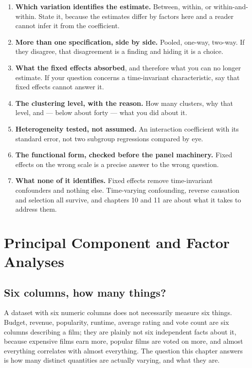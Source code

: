 \documentclass[
  letterpaper,
  10pt,
  twoside,
  openright,
  numbers=noenddot,
  chapterprefix=true]{scrbook}
\providecommand{\tightlist}{%
  \setlength{\itemsep}{0pt}\setlength{\parskip}{0pt}}
\begin{document}
\begin{enumerate}
\def\labelenumi{\arabic{enumi}.}
\tightlist
\item
  \textbf{Which variation identifies the estimate.} Between, within, or
  within-and-within. State it, because the estimates differ by factors
  here and a reader cannot infer it from the coefficient.
\item
  \textbf{More than one specification, side by side.} Pooled, one-way,
  two-way. If they disagree, that disagreement is a finding and hiding
  it is a choice.
\item
  \textbf{What the fixed effects absorbed}, and therefore what you can
  no longer estimate. If your question concerns a time-invariant
  characteristic, say that fixed effects cannot answer it.
\item
  \textbf{The clustering level, with the reason.} How many clusters, why
  that level, and --- below about forty --- what you did about it.
\item
  \textbf{Heterogeneity tested, not assumed.} An interaction coefficient
  with its standard error, not two subgroup regressions compared by eye.
\item
  \textbf{The functional form, checked before the panel machinery.}
  Fixed effects on the wrong scale is a precise answer to the wrong
  question.
\item
  \textbf{What none of it identifies.} Fixed effects remove
  time-invariant confounders and nothing else. Time-varying confounding,
  reverse causation and selection all survive, and chapters 10 and 11
  are about what it takes to address them.
\end{enumerate}


\chapter{Principal Component and Factor
Analyses}\label{principal-component-and-factor-analyses}

\section{Six columns, how many
things?}\label{six-columns-how-many-things}

A dataset with six numeric columns does not necessarily measure six
things. Budget, revenue, popularity, runtime, average rating and vote
count are six columns describing a film; they are plainly not six
independent facts about it, because expensive films earn more, popular
films are voted on more, and almost everything correlates with almost
everything. The question this chapter answers is how many distinct
quantities are actually varying, and what they are.
\end{document}
